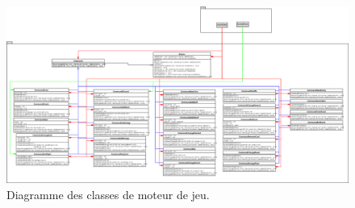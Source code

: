 \begin{landscape}
\begin{figure}[hp]
\includegraphics[width=0.9\paperheight]{images/engine.png}
\caption{\label{uml:engine}Diagramme des classes de moteur de jeu.} 
\end{figure}
\end{landscape}

\newpage